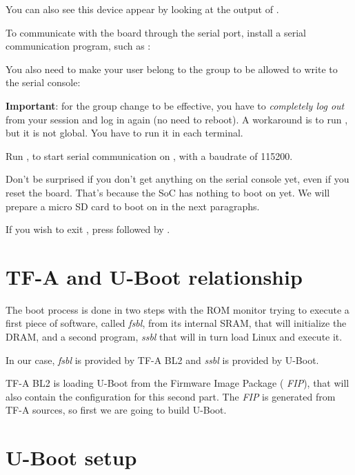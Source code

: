 You can also see this device appear by looking at the output of
.

To communicate with the board through the serial port, install a
serial communication program, such as :


You also need to make your user belong to the  group to be
allowed to write to the serial console:


{\bf Important}: for the group change to be effective, you have to
{\em completely log out} from your session and log in again (no need to
reboot). A workaround is to run , but it is not global.
You have to run it in each terminal.

Run , to start serial
communication on , with a baudrate of 115200.

Don't be surprised if you don't get anything on the serial console yet,
even if you reset the board. That's because the SoC has nothing to boot
on yet. We will prepare a micro SD card to boot on in the next paragraphs.

If you wish to exit , press \code{[Ctrl][a]} followed by
\code{[Ctrl][x]}.

\section{TF-A and U-Boot relationship}

The boot process is done in two steps with the ROM monitor trying to
execute a first piece of software, called {\em fsbl}, from its
internal SRAM, that will initialize the DRAM, and a second program,
{\em ssbl} that will in turn load Linux and execute it.

In our case, {\em fsbl} is provided by TF-A BL2 and {\em
  ssbl} is provided by U-Boot.

TF-A BL2 is loading U-Boot from the Firmware Image Package ({\em
  FIP}), that will also contain the configuration for this second
part. The {\em FIP} is generated from TF-A sources, so first we are
going to build U-Boot.

\section{U-Boot setup}

